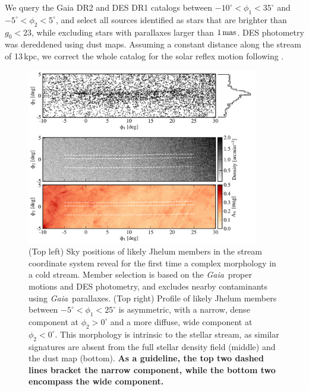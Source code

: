\documentclass[twocolumn]{aastex62}
\newcommand{\gaia}{\textsl{Gaia}}
\newcommand{\changes}[1]{{\textbf{#1}}}
\begin{document}
We query the Gaia DR2 \citep{gdr2} and DES DR1 \citep{abbott2018} catalogs between $-10^\circ<\phi_1<35^\circ$ and $-5^\circ<\phi_2<5^\circ$, and select all sources identified as stars that are brighter than $g_0<23$, while excluding stars with parallaxes larger than $1\,\rm mas$.
DES photometry was dereddened using \citet{sfd} dust maps.
Assuming a constant distance along the stream of 13\,kpc, we correct the whole catalog for the solar reflex motion following \citet{pwb}.

\begin{figure}
\begin{center}
\includegraphics[width=0.9\textwidth]{map.pdf}
\end{center}
\caption{
(Top left) Sky positions of likely Jhelum members in the stream coordinate system reveal for the first time a complex morphology in a cold stream.
Member selection is based on the \gaia\ proper motions and DES photometry, and excludes nearby contaminants using \gaia\ parallaxes.
(Top right) Profile of likely Jhelum members between $-5^\circ<\phi_1<25^\circ$ is asymmetric, with a narrow, dense component at $\phi_2>0^\circ$ and a more diffuse, wide component at $\phi_2<0^\circ$.
This morphology is intrinsic to the stellar stream, as similar signatures are absent from the full stellar density field (middle) and the dust map (bottom).
\changes{As a guideline, the top two dashed lines bracket the narrow component, while the bottom two encompass the wide component.}
}
\label{fig:map}
\end{figure}
\end{document}
